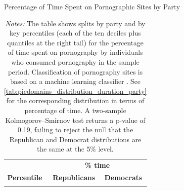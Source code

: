 \documentclass[12pt, letterpaper]{article}
\begin{document}
\begin{table}[ht] \centering \small \setlength\tabcolsep{10 pt}
	\caption{Percentage of Time Spent on Pornographic Sites by Party}
	\label{tab:piedomains_distribution_prop_duration_party}
	\begin{adjustbox}{max width=\textwidth}
		\begin{tabular}{crr}
			\toprule
			\multicolumn{1}{l}{\textbf{}}&\multicolumn{2}{c}{\textbf{\% time}}\\
			\cmidrule(l){2-3}
			\multicolumn{1}{l}{\textbf{Percentile}}&\multicolumn{1}{c}{\textbf{Republicans}}&\multicolumn{1}{c}{\textbf{Democrats}}\\
			\midrule
			\\
			\bottomrule
		\end{tabular}
	\end{adjustbox}
	\caption*{\footnotesize \emph{Notes:} 
		The table shows splits by party and by key percentiles (each of the ten deciles plus quantiles at the right tail) for the percentage of time spent on pornography by individuals who consumed pornography in the sample period. 
		Classification of pornography sites is based on a machine learning classifier \citep{Chintalapati_piedomains_Predict_the_2022}.
		See \cref{tab:piedomains_distribution_duration_party} for the corresponding distribution in terms of percentage of time.
		A two-sample Kolmogorov–Smirnov test returns a p-value of 0.19, failing to reject the null that the Republican and Democrat distributions are the same at the 5\% level.
	}
\end{table}

\FloatBarrier
\clearpage
\end{document}
